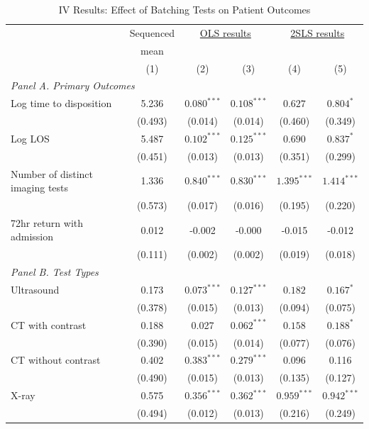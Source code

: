 \documentclass[,,nonblindrev]{informs}
\begin{document}
\begin{table}[ht]
\centering
\caption{IV Results: Effect of Batching Tests on Patient Outcomes}
\label{tab:results_table}
\begin{threeparttable}
\begin{tabular}{lccccc}
\toprule
& Sequenced & \multicolumn{2}{c}{\underline{OLS results}} & \multicolumn{2}{c}{\underline{2SLS results}} \\
& mean & \multicolumn{2}{c}{} & \multicolumn{2}{c}{} \\
& (1) & (2) & (3) & (4) & (5) \\
\midrule
\multicolumn{6}{l}{\textit{Panel A. Primary Outcomes}} \\[0.5em]
Log time to disposition & 5.236 & $0.080^{***}$ & $0.108^{***}$ & $0.627$ & $0.804^{*}$ \\
& (0.493) & (0.014) & (0.014) & (0.460) & (0.349) \\[0.5em]
Log LOS & 5.487 & $0.102^{***}$ & $0.125^{***}$ & $0.690$ & $0.837^{*}$ \\
& (0.451) & (0.013) & (0.013) & (0.351) & (0.299) \\[0.5em]
Number of distinct imaging tests & 1.336 & $0.840^{***}$ & $0.830^{***}$ & $1.395^{***}$ & $1.414^{***}$ \\
& (0.573) & (0.017) & (0.016) & (0.195) & (0.220) \\[0.5em]
72hr return with admission & 0.012 & -0.002 & -0.000 & -0.015 & -0.012 \\
& (0.111) & (0.002) & (0.002) & (0.019) & (0.018) \\[0.5em]
\multicolumn{6}{l}{\textit{Panel B. Test Types}} \\[0.5em]
Ultrasound & 0.173 & $0.073^{***}$ & $0.127^{***}$ & $0.182$ & $0.167^{*}$ \\
& (0.378) & (0.015) & (0.013) & (0.094) & (0.075) \\[0.5em]
CT with contrast & 0.188 & 0.027 & $0.062^{***}$ & $0.158$ & $0.188^{*}$ \\
& (0.390) & (0.015) & (0.014) & (0.077) & (0.076) \\[0.5em]
CT without contrast & 0.402 & $0.383^{***}$ & $0.279^{***}$ & 0.096 & 0.116 \\
& (0.490) & (0.015) & (0.013) & (0.135) & (0.127) \\[0.5em]
X-ray & 0.575 & $0.356^{***}$ & $0.362^{***}$ & $0.959^{***}$ & $0.942^{***}$ \\
& (0.494) & (0.012) & (0.013) & (0.216) & (0.249) \\[0.5em]

\end{tabular}
\end{threeparttable}
\end{table}
\end{document}
